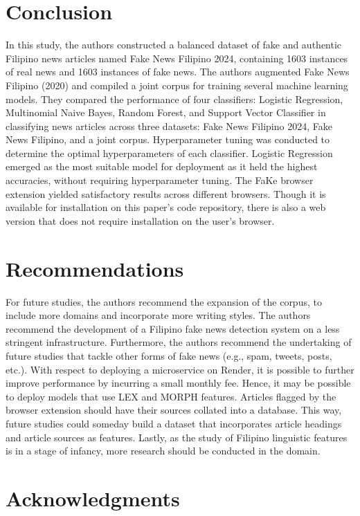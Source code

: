 \documentclass[conference]{IEEEtran}
\begin{document}
\section{Conclusion}

In this study, the authors constructed a balanced dataset of fake and authentic Filipino news articles named Fake News Filipino 2024, containing 1603 instances of real news and 1603 instances of fake news. The authors augmented Fake News Filipino (2020) and compiled a joint corpus for training several machine learning models. They compared the performance of four classifiers: Logistic Regression, Multinomial Naive Bayes, Random Forest, and Support Vector Classifier in classifying news articles across three datasets: Fake News Filipino 2024, Fake News Filipino, and a joint corpus. Hyperparameter tuning was conducted to determine the optimal hyperparameters of each classifier. Logistic Regression emerged as the most suitable model for deployment as it held the highest accuracies, without requiring hyperparameter tuning. The FaKe browser extension yielded satisfactory results across different browsers. Though it is available for installation on this paper's code repository, there is also a web version that does not require installation on the user's browser.

\section{Recommendations}

For future studies, the authors recommend the expansion of the corpus, to include more domains and incorporate more writing styles. The authors recommend the development of a Filipino fake news detection system on a less stringent infrastructure. Furthermore, the authors recommend the undertaking of future studies that tackle other forms of fake news (e.g., spam, tweets, posts, etc.). With respect to deploying a microservice on Render, it is possible to further improve performance by incurring a small monthly fee. Hence, it may be possible to deploy models that use LEX and MORPH features. Articles flagged by the browser extension should have their sources collated into a database. This way, future studies could someday build a dataset that incorporates article headings and article sources as features. Lastly, as the study of Filipino linguistic features is in a stage of infancy, more research should be conducted in the domain.  

\section*{Acknowledgments}
\end{document}
